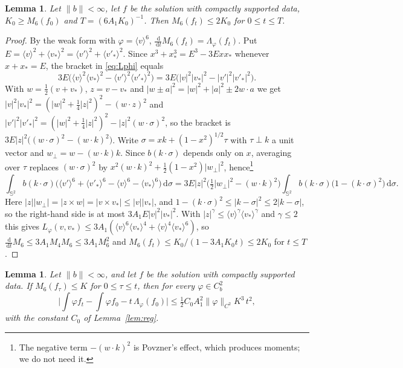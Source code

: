 \documentclass[11pt]{amsart}
\newtheorem{lemma}[theorem]{Lemma}
\theoremstyle{definition}
\newcommand{\Sph}{\mathbb{S}}
\newcommand{\dd}{\,\mathrm{d}}
\newcommand{\jb}[1]{\langle #1\rangle}
\newcommand{\nb}{\|b\|}
\begin{document}
\begin{lemma}\label{lem:moments}
Let $\nb<\infty$, let $f$ be the solution with compactly supported data, $K_0\ge M_6(f_0)$ and $T=(6A_1K_0)^{-1}$. Then $M_6(f_t)\le2K_0$ for $0\le t\le T$.
\end{lemma}

\begin{proof}
By the weak form with $\varphi=\jb{v}^6$, $\frac{\dd}{\dd t}M_6(f_t)=\Lambda_\varphi(f_t)$. Put $E=\jb{v}^2+\jb{v_*}^2=\jb{v'}^2+\jb{v'_*}^2$. Since $x^3+x_*^3=E^3-3Exx_*$ whenever $x+x_*=E$, the bracket in \eqref{eq:Lphi} equals
\[
3E\big(\jb{v}^2\jb{v_*}^2-\jb{v'}^2\jb{v'_*}^2\big)=3E\big(|v|^2|v_*|^2-|v'|^2|v'_*|^2\big).
\]
With $w=\frac12(v+v_*)$, $z=v-v_*$ and $|w\pm a|^2=|w|^2+|a|^2\pm2w\cdot a$ we get $|v|^2|v_*|^2=(|w|^2+\frac14|z|^2)^2-(w\cdot z)^2$ and $|v'|^2|v'_*|^2=(|w|^2+\frac14|z|^2)^2-|z|^2(w\cdot\sigma)^2$, so the bracket is $3E|z|^2\big((w\cdot\sigma)^2-(w\cdot k)^2\big)$. Write $\sigma=xk+(1-x^2)^{1/2}\tau$ with $\tau\perp k$ a unit vector and $w_\perp=w-(w\cdot k)k$. Since $b(k\cdot\sigma)$ depends only on $x$, averaging over $\tau$ replaces $(w\cdot\sigma)^2$ by $x^2(w\cdot k)^2+\frac12(1-x^2)|w_\perp|^2$, hence\footnote{The negative term $-(w\cdot k)^2$ is Povzner's effect, which produces moments; we do not need it.}
\[
\int_{\Sph^2}b(k\cdot\sigma)\big(\jb{v'}^6+\jb{v'_*}^6-\jb{v}^6-\jb{v_*}^6\big)\dd\sigma=3E|z|^2\Big(\tfrac12|w_\perp|^2-(w\cdot k)^2\Big)\int_{\Sph^2}b(k\cdot\sigma)\big(1-(k\cdot\sigma)^2\big)\dd\sigma .
\]
Here $|z||w_\perp|=|z\times w|=|v\times v_*|\le|v||v_*|$, and $1-(k\cdot\sigma)^2\le|k-\sigma|^2\le2|k-\sigma|$, so the right-hand side is at most $3A_1E|v|^2|v_*|^2$. With $|z|^\gamma\le\jb{v}^\gamma\jb{v_*}^\gamma$ and $\gamma\le2$ this gives $L_\varphi(v,v_*)\le3A_1(\jb{v}^6\jb{v_*}^4+\jb{v}^4\jb{v_*}^6)$, so $\frac{\dd}{\dd t}M_6\le3A_1M_4M_6\le3A_1M_6^2$ and $M_6(f_t)\le K_0/(1-3A_1K_0t)\le2K_0$ for $t\le T$.
\end{proof}

\begin{lemma}\label{lem:expansion}
Let $\nb<\infty$, and let $f$ be the solution with compactly supported data. If $M_6(f_\tau)\le K$ for $0\le\tau\le t$, then for every $\varphi\in C^2_b$
\[
\Big|\int\varphi f_t-\int\varphi f_0-t\,\Lambda_\varphi(f_0)\Big|\le \tfrac12C_0A_1^2\|\varphi\|_{C^2}K^3\,t^2 ,
\]
with the constant $C_0$ of Lemma~\ref{lem:reg}.
\end{lemma}
\end{document}
